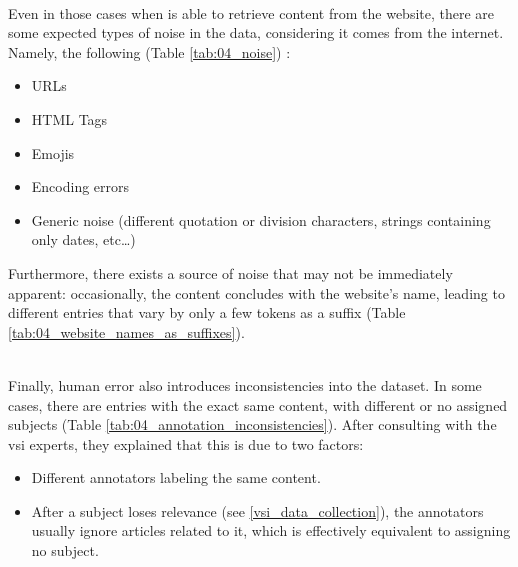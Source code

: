 




\label{vsi_issues_data_noise}
\ \\

Even in those cases when \trafilatura{} is able to retrieve content from the website, there are some expected types of noise in the data, considering it comes from the internet.
Namely, the following  (Table \ref{tab:04_noise}) :
\begin{itemize}
    \item URLs
    \item HTML Tags
    \item Emojis
    \item Encoding errors
    \item Generic noise (different quotation or division characters, strings containing only dates, etc\ldots)
\end{itemize}









Furthermore, there exists a source of noise that may not be immediately apparent: occasionally, the content concludes with the website's name, leading to different entries that vary by only a few tokens as a suffix (Table \ref{tab:04_website_names_as_suffixes}).




\label{vsi_issues_annotation_inconsistencies}
\ \\

Finally, human error also introduces inconsistencies into the \VSI{} dataset. In some cases, there are entries with the exact same content, with different or no assigned subjects (Table \ref{tab:04_annotation_inconsistencies}). After consulting with the \gls{vsi} experts, they explained that this is due to two factors:

\begin{itemize}
    \item Different annotators labeling the same content.
    \item After a subject loses relevance (see \headerName{} \ref{vsi_data_collection}), the annotators usually ignore articles related to it, which is effectively equivalent to assigning no subject.
\end{itemize}








\clearpage